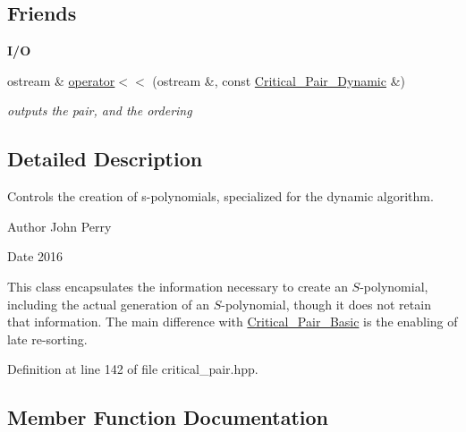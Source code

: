 \subsection*{Friends}
\begin{Indent}\textbf{ I/O}\par
\begin{DoxyCompactItemize}
\item 
\mbox{\label{class_critical___pair___dynamic_a3c0c965ed52ffe0faf759023605adaf2}} 
ostream \& \hyperlink{class_critical___pair___dynamic_a3c0c965ed52ffe0faf759023605adaf2}{operator$<$$<$} (ostream \&, const \hyperlink{class_critical___pair___dynamic}{Critical\+\_\+\+Pair\+\_\+\+Dynamic} \&)
\begin{DoxyCompactList}\small\item\em outputs the pair, and the ordering \end{DoxyCompactList}\end{DoxyCompactItemize}
\end{Indent}


\subsection{Detailed Description}
Controls the creation of s-\/polynomials, specialized for the dynamic algorithm. 

\begin{DoxyAuthor}{Author}
John Perry 
\end{DoxyAuthor}
\begin{DoxyDate}{Date}
2016
\end{DoxyDate}
This class encapsulates the information necessary to create an $S$-\/polynomial, including the actual generation of an $S$-\/polynomial, though it does not retain that information. The main difference with {\ttfamily \hyperlink{class_critical___pair___basic}{Critical\+\_\+\+Pair\+\_\+\+Basic}} is the enabling of late re-\/sorting. 

Definition at line 142 of file critical\+\_\+pair.\+hpp.



\subsection{Member Function Documentation}
\mbox{\label{class_critical___pair___dynamic_aa9001ca49b2c2fd7d39384e4e70c5a6b}} 
